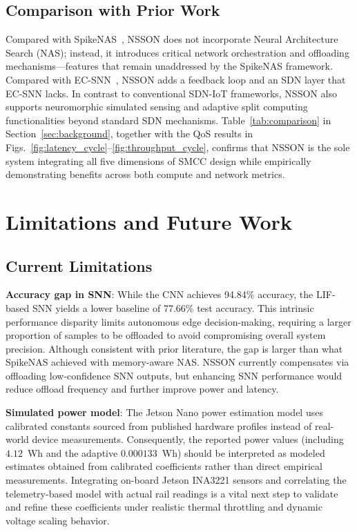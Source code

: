 \documentclass[journal]{IEEEtran}
\newcommand{\revblue}[1]{\textcolor{revblue}{#1}}
\begin{document}
\subsection{Comparison with Prior Work}
Compared with SpikeNAS~\cite{putra2025spikenas}, NSSON does not incorporate Neural Architecture Search (NAS); instead, it introduces critical network orchestration and offloading mechanisms—features that remain unaddressed by the SpikeNAS framework. Compared with EC-SNN~\cite{di2024ec}, NSSON adds a feedback loop and an SDN layer that EC-SNN lacks. In contrast to conventional SDN-IoT frameworks, NSSON also supports neuromorphic simulated sensing and adaptive split computing functionalities beyond standard SDN mechanisms.  
Table~\ref{tab:comparison} in Section~\ref{sec:background}, together with the QoS results in Figs.~\ref{fig:latency_cycle}–\ref{fig:throughput_cycle}, confirms that NSSON is the sole system integrating all five dimensions of SMCC design while empirically demonstrating benefits across both compute and network metrics.

\section{Limitations and Future Work}
\label{sec:limitations}

\subsection{Current Limitations}

\textbf{Accuracy gap in SNN}: While the CNN achieves 94.84\% accuracy, the LIF-based SNN yields a lower baseline of 77.66\% test accuracy. This intrinsic performance disparity limits autonomous edge decision-making, requiring a larger proportion of samples to be offloaded to avoid compromising overall system precision. Although consistent with prior literature, the gap is larger than what SpikeNAS achieved with memory-aware NAS. NSSON currently compensates via offloading low-confidence SNN outputs, but enhancing SNN performance would reduce offload frequency and further improve power and latency.

\textbf{Simulated power model}: The Jetson Nano power estimation model uses calibrated constants sourced from published hardware profiles instead of real-world device measurements. \revblue{Consequently, the reported power values (including $4.12$~Wh and the
adaptive $0.000133$~Wh) should be interpreted as modeled estimates
obtained from calibrated coefficients rather than direct empirical
measurements. Integrating on-board Jetson INA3221 sensors and
correlating the telemetry-based model with actual rail readings is a
vital next step to validate and refine these coefficients under realistic
thermal throttling and dynamic voltage scaling behavior.}
\end{document}
